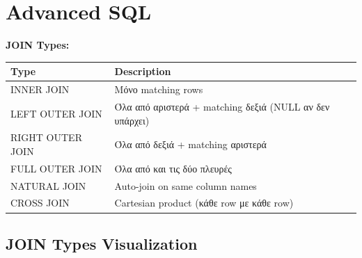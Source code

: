 
\chapter{Advanced SQL}

\begin{formulabox}
\textbf{JOIN Types:}
\begin{center}
\begin{tabular}{lp{8cm}}
\toprule
\textbf{Type} & \textbf{Description} \\
\midrule
INNER JOIN & Μόνο matching rows \\
LEFT OUTER JOIN & Όλα από αριστερά + matching δεξιά (NULL αν δεν υπάρχει) \\
RIGHT OUTER JOIN & Όλα από δεξιά + matching αριστερά \\
FULL OUTER JOIN & Όλα από και τις δύο πλευρές \\
NATURAL JOIN & Auto-join on same column names \\
CROSS JOIN & Cartesian product (κάθε row με κάθε row) \\
\bottomrule
\end{tabular}
\end{center}
\end{formulabox}

\section{JOIN Types Visualization}

